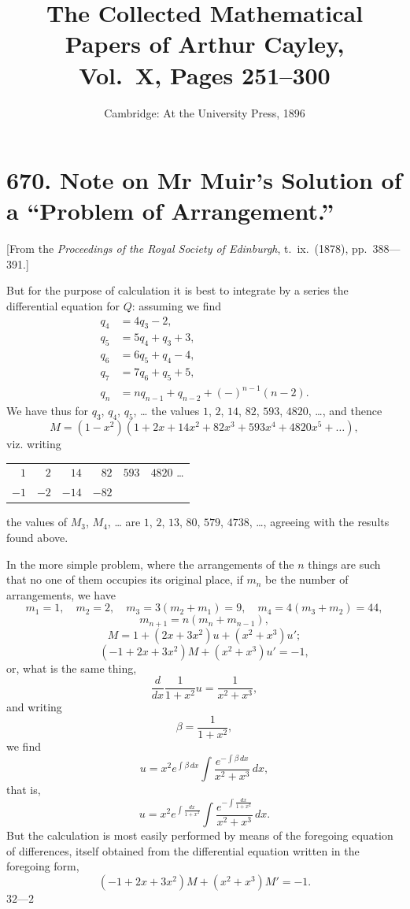 \documentclass[12pt,a4paper]{article}
\title{\textbf{The Collected Mathematical Papers of Arthur Cayley,\\Vol.\ X, Pages 251--300}}
\author{}
\date{Cambridge: At the University Press, 1896}
\theoremstyle{cayley}
\theoremstyle{definition}
\numberwithin{equation}{section}
\begin{document}
\maketitle
\thispagestyle{empty}

\tableofcontents
\newpage


\section*{670. Note on Mr Muir's Solution of a ``Problem of Arrangement.''}

[From the \textit{Proceedings of the Royal Society of Edinburgh}, t.\ ix.\ (1878), pp.\ 388---391.]

\vspace{0.5em}
\noindent
But for the purpose of calculation it is best to integrate by a series the differential equation for $Q$: assuming we find
\begin{align*}
q_4 &= 4q_3 - 2,\\
q_5 &= 5q_4 + q_3 + 3,\\
q_6 &= 6q_5 + q_4 - 4,\\
q_7 &= 7q_6 + q_5 + 5,\\
q_n &= nq_{n-1} + q_{n-2} + (-)^{n-1}(n-2).
\end{align*}
We have thus for $q_3$, $q_4$, $q_5$, \dots{} the values $1$, $2$, $14$, $82$, $593$, $4820$, \dots{}, and thence
\[
M = (1 - x^2)(1 + 2x + 14x^2 + 82x^3 + 593x^4 + 4820x^5 + \dots),
\]
viz. writing
\begin{center}
\begin{tabular}{rrrrrr}
$1$ & $2$ & $14$ & $82$ & $593$ & $4820$ \dots\\
$-1$ & $-2$ & $-14$ & $-82$
\end{tabular}
\end{center}
the values of $M_3$, $M_4$, \dots{} are $1$, $2$, $13$, $80$, $579$, $4738$, \dots{}, agreeing with the results found above.

In the more simple problem, where the arrangements of the $n$ things are such that no one of them occupies its original place, if $m_n$ be the number of arrangements, we have
\[
m_1 = 1, \quad m_2 = 2, \quad m_3 = 3(m_2 + m_1) = 9, \quad m_4 = 4(m_3 + m_2) = 44,
\]
\[
m_{n+1} = n(m_n + m_{n-1}),
\]
\[
M = 1 + (2x + 3x^2)u + (x^2 + x^3)u';
\]
\[
(-1 + 2x + 3x^2)M + (x^2 + x^3)u' = -1,
\]
or, what is the same thing,
\[
\frac{d}{dx}\frac{1}{1+x^2}u = \frac{1}{x^2+x^3},
\]
and writing
\[
\beta = \frac{1}{1+x^2},
\]
we find
\[
u = x^2 e^{\int \beta \, dx} \int \frac{e^{-\int \beta \, dx}}{x^2+x^3} \, dx,
\]
that is,
\[
u = x^2 e^{\int \frac{dx}{1+x^2}} \int \frac{e^{-\int \frac{dx}{1+x^2}}}{x^2+x^3} \, dx.
\]
But the calculation is most easily performed by means of the foregoing equation of differences, itself obtained from the differential equation written in the foregoing form,
\[
(-1 + 2x + 3x^2)M + (x^2 + x^3)M' = -1.
\]
\hfill $32\text{---}2$
\end{document}
